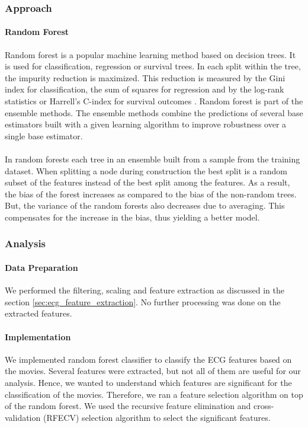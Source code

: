 \subsubsection{Approach}
\paragraph{Random Forest} Random forest \cite{breiman2001random} is a popular machine learning method based on decision trees. It is used for classification, regression or survival trees. In each split within the tree, the impurity reduction is maximized. This reduction is measured by the Gini index for classification, the sum of squares for regression and by the log-rank statistics or Harrell's C-index for survival outcomes \cite{wright_splitting_2019}. Random forest is part of the  ensemble methods. The ensemble methods combine the predictions of several base estimators built with a given learning algorithm to improve robustness over a single base estimator.

\paragraph{} In random forests each tree in an ensemble built from a sample from the training dataset. When splitting a node during construction the best split is a random subset of the features instead of the best split among the features. As a result, the bias of the forest increases as compared to the bias of the non-random trees. But, the variance of the random forests also decreases due to averaging. This compensates for the increase in the bias, thus yielding a better model.

\subsubsection{Analysis}
\paragraph{Data Preparation}  We performed the filtering, scaling and feature extraction as discussed in the section \ref{sec:ecg_feature_extraction}. No further processing was done on the extracted features.

\paragraph{Implementation} We implemented random forest classifier to classify the ECG features based on the movies. Several features were extracted, but not all of them are useful for our analysis. Hence, we wanted to understand which features are significant for the classification of the movies. Therefore, we ran a feature selection algorithm on top of the random forest. We used the recursive feature elimination and cross-validation (RFECV) \cite{sklearn_rfecv} selection algorithm to select the significant features.

